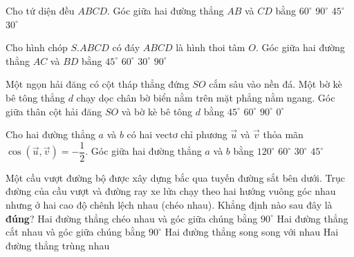 \begin{ex}
    Cho tứ diện đều $ABCD$. Góc giữa hai đường thẳng $AB$ và $CD$ bằng
    \choice
    {$60^\circ$}
    {\True $90^\circ$}
    {$45^\circ$}
    {$30^\circ$}
\end{ex}

\begin{ex}
    Cho hình chóp $S.ABCD$ có đáy $ABCD$ là hình thoi tâm $O$. Góc giữa hai đường thẳng $AC$ và $BD$ bằng
    \choice
    {$45^\circ$}
    {$60^\circ$}
    {$30^\circ$}
    {\True $90^\circ$}
\end{ex}

\begin{ex}
    Một ngọn hải đăng có cột tháp thẳng đứng $SO$ cắm sâu vào nền đá. Một bờ kè bê tông thẳng $d$ chạy dọc chân bờ biển nằm trên mặt phẳng nằm ngang. Góc giữa thân cột hải đăng $SO$ và bờ kè bê tông $d$ bằng
    \choice
    {$45^\circ$}
    {$60^\circ$}
    {\True $90^\circ$}
    {$0^\circ$}
\end{ex}

\begin{ex}
    Cho hai đường thẳng $a$ và $b$ có hai vectơ chỉ phương $\vec{u}$ và $\vec{v}$ thỏa mãn $\cos(\vec{u}, \vec{v}) = -\dfrac{1}{2}$. Góc giữa hai đường thẳng $a$ và $b$ bằng
    \choice
    {$120^\circ$}
    {\True $60^\circ$}
    {$30^\circ$}
    {$45^\circ$}
\end{ex}

\begin{ex}
    Một cầu vượt đường bộ được xây dựng bắc qua tuyến đường sắt bên dưới. Trục đường của cầu vượt và đường ray xe lửa chạy theo hai hướng vuông góc nhau nhưng ở hai cao độ chênh lệch nhau (chéo nhau). Khẳng định nào sau đây là \textbf{đúng}?
    \choice
    {\True Hai đường thẳng chéo nhau và góc giữa chúng bằng $90^\circ$}
    {Hai đường thẳng cắt nhau và góc giữa chúng bằng $90^\circ$}
    {Hai đường thẳng song song với nhau}
    {Hai đường thẳng trùng nhau}
\end{ex}

